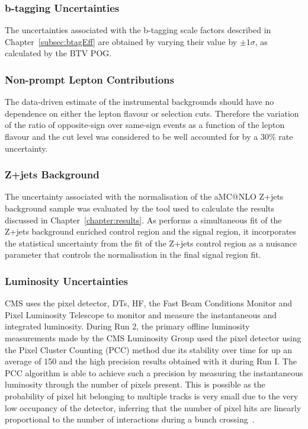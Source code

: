 \subsubsection{b-tagging Uncertainties}
The uncertainties associated with the b-tagging scale factors described in Chapter~\ref{subsec:btagEff} are obtained by varying their value by $\pm 1\sigma$, as calculated by the BTV POG.

\subsubsection{Non-prompt Lepton Contributions}
The data-driven estimate of the instrumental backgrounds should have no dependence on either the lepton flavour or selection cuts.
Therefore the variation of the ratio of opposite-sign over same-sign events as a function of the lepton flavour and the cut level was considered to be well accounted for by a 30\% rate uncertainty.

\subsubsection{Z+jets Background}
The uncertainty associated with the normalisation of the aMC@NLO Z+jets background sample was evaluated by the \combine tool used to calculate the results discussed in Chapter~\ref{chapter:results}.
As \combine performs a simultaneous fit of the Z+jets background enriched control region and the signal region, it incorporates the statistical uncertainty from the fit of the Z+jets control region as a nuisance parameter that controls the normalisation in the final signal region fit.

\subsubsection{Luminosity Uncertainties}
CMS uses the pixel detector, DTs, HF, the Fast Beam Conditions Monitor and Pixel Luminosity Telescope to monitor and measure the instantaneous and integrated luminosity.
During Run 2, the primary offline luminosity measurements made by the CMS Luminosity Group used the pixel detector using the Pixel Cluster Counting (PCC) method due its stability over time for up an average \PU of 150 and the high precision results obtained with it during Run I.
The PCC algorithm is able to achieve such a precision by measuring the instantaneous luminosity through the number of pixels present. 
This is possible as the probability of pixel hit belonging to multiple tracks is very small due to the very low occupancy of the detector, inferring that the number of pixel hits are linearly proportional to the number of interactions during a bunch crossing~\cite{CMS:2017_lumi}.

